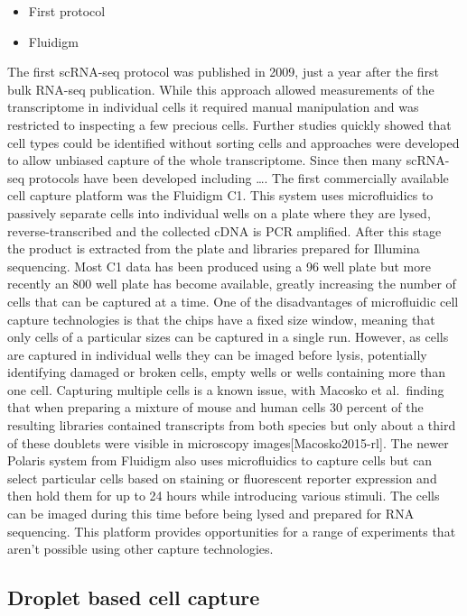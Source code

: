 \documentclass[11pt,a4paper,titlepage,twoside,openright]{style/unimelbthesis}
\theoremstyle{definition}
\theoremstyle{definition}
\theoremstyle{definition}
\theoremstyle{remark}
\begin{document}
\begin{mainmatter}
\begin{itemize}
\tightlist
\item
  First protocol
\item
  Fluidigm
\end{itemize}

The first scRNA-seq protocol was published in 2009, just a year after the first bulk RNA-seq publication. While this approach allowed measurements of the transcriptome in individual cells it required manual manipulation and was restricted to inspecting a few precious cells. Further studies quickly showed that cell types could be identified without sorting cells and approaches were developed to allow unbiased capture of the whole transcriptome. Since then many scRNA-seq protocols have been developed including \ldots{}. The first commercially available cell capture platform was the Fluidigm C1. This system uses microfluidics to passively separate cells into individual wells on a plate where they are lysed, reverse-transcribed and the collected cDNA is PCR amplified. After this stage the product is extracted from the plate and libraries prepared for Illumina sequencing. Most C1 data has been produced using a 96 well plate but more recently an 800 well plate has become available, greatly increasing the number of cells that can be captured at a time. One of the disadvantages of microfluidic cell capture technologies is that the chips have a fixed size window, meaning that only cells of a particular sizes can be captured in a single run. However, as cells are captured in individual wells they can be imaged before lysis, potentially identifying damaged or broken cells, empty wells or wells containing more than one cell. Capturing multiple cells is a known issue, with Macosko et al.~finding that when preparing a mixture of mouse and human cells 30 percent of the resulting libraries contained transcripts from both species but only about a third of these doublets were visible in microscopy images{[}Macosko2015-rl{]}. The newer Polaris system from Fluidigm also uses microfluidics to capture cells but can select particular cells based on staining or fluorescent reporter expression and then hold them for up to 24 hours while introducing various stimuli. The cells can be imaged during this time before being lysed and prepared for RNA sequencing. This platform provides opportunities for a range of experiments that aren't possible using other capture technologies.

\hypertarget{droplet-based-cell-capture}{%
\subsection{Droplet based cell capture}\label{droplet-based-cell-capture}}


\end{mainmatter}
\end{document}
